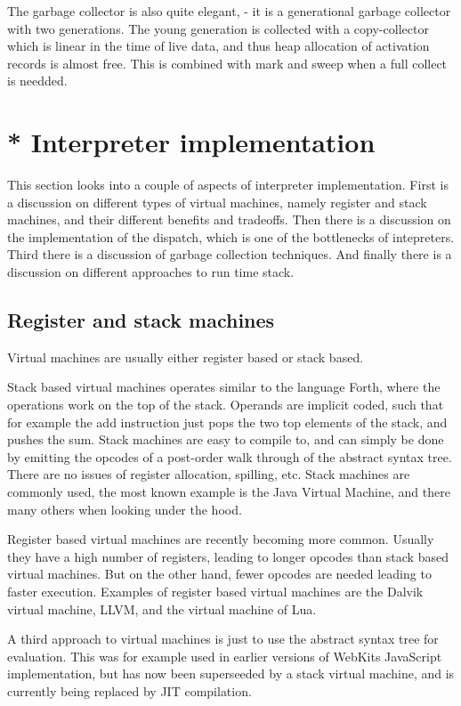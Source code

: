 The garbage collector is also quite elegant, - it is a generational garbage collector with two generations. The young generation is collected with a copy-collector which is linear in the time of live data, and thus heap allocation of activation records is almost free. 
This is combined with mark and sweep when a full collect is needded.


\section{* Interpreter implementation}
\label{interpreter-implementation}
This section looks into a couple of aspects of interpreter implementation.
First is a discussion on different types of virtual machines, namely register and stack machines, and their different benefits and tradeoffs.
Then there is a discussion on the implementation of the dispatch, which is one of the bottlenecks of intepreters.
Third there is a discussion of garbage collection techniques.
And finally there is a discussion on different approaches to run time stack.

\subsection{Register and stack machines}
Virtual machines are usually either register based or stack based.

Stack based virtual machines operates similar to the language Forth, where the operations work on the top of the stack. 
Operands are implicit coded, such that for example the add instruction just pops the two top elements of the stack, and pushes the sum. 
Stack machines are easy to compile to, 
and can simply be done by emitting the opcodes of a post-order walk through of the abstract syntax tree. 
There are no issues of register allocation, spilling, etc.
Stack machines are commonly used, the most known example is the Java Virtual Machine, and there many others when looking under the hood.

Register based virtual machines are recently becoming more common. 
Usually they have a high number of registers, leading to longer opcodes than stack based virtual machines. But on the other hand, fewer opcodes are needed leading to faster execution\cite{register-vs-stack}. 
Examples of register based virtual machines are the Dalvik\cite{dalvik} virtual machine, LLVM\cite{llvm}, and the virtual machine of Lua\cite{luavm}.

A third approach to virtual machines is just to use the abstract syntax tree for evaluation. This was for example used in earlier versions of WebKits JavaScript implementation, but has now been superseeded by a stack virtual machine, and is currently being replaced by JIT compilation.

